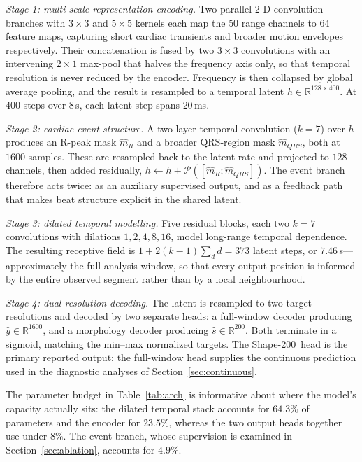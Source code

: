 \documentclass[lettersize,journal]{IEEEtran}
\newcommand{\shape}{Shape-200\xspace}
\begin{document}
\emph{Stage 1: multi-scale representation encoding.} Two parallel $2$-D convolution branches with $3\times3$ and $5\times5$ kernels each map the $50$ range channels to $64$ feature maps, capturing short cardiac transients and broader motion envelopes respectively. Their concatenation is fused by two $3\times3$ convolutions with an intervening $2\times1$ max-pool that halves the frequency axis only, so that temporal resolution is never reduced by the encoder. Frequency is then collapsed by global average pooling, and the result is resampled to a temporal latent $h \in \mathbb{R}^{128 \times 400}$. At $400$ steps over $8$\,s, each latent step spans $20$\,ms.

\emph{Stage 2: cardiac event structure.} A two-layer temporal convolution ($k=7$) over $h$ produces an R-peak mask $\hat{m}_R$ and a broader QRS-region mask $\hat{m}_{QRS}$, both at $1600$ samples. These are resampled back to the latent rate and projected to $128$ channels, then added residually, $h \leftarrow h + \mathcal{P}([\hat{m}_R; \hat{m}_{QRS}])$. The event branch therefore acts twice: as an auxiliary supervised output, and as a feedback path that makes beat structure explicit in the shared latent.

\emph{Stage 3: dilated temporal modelling.} Five residual blocks, each two $k=7$ convolutions with dilations $1, 2, 4, 8, 16$, model long-range temporal dependence. The resulting receptive field is $1 + 2(k-1)\sum_d d = 373$ latent steps, or $7.46$\,s---approximately the full analysis window, so that every output position is informed by the entire observed segment rather than by a local neighbourhood.

\emph{Stage 4: dual-resolution decoding.} The latent is resampled to two target resolutions and decoded by two separate heads: a full-window decoder producing $\hat{y} \in \mathbb{R}^{1600}$, and a morphology decoder producing $\hat{s} \in \mathbb{R}^{200}$. Both terminate in a sigmoid, matching the min--max normalized targets. The \shape\ head is the primary reported output; the full-window head supplies the continuous prediction used in the diagnostic analyses of Section~\ref{sec:continuous}.

The parameter budget in Table~\ref{tab:arch} is informative about where the model's capacity actually sits: the dilated temporal stack accounts for $64.3\%$ of parameters and the encoder for $23.5\%$, whereas the two output heads together use under $8\%$. The event branch, whose supervision is examined in Section~\ref{sec:ablation}, accounts for $4.9\%$.
\end{document}
